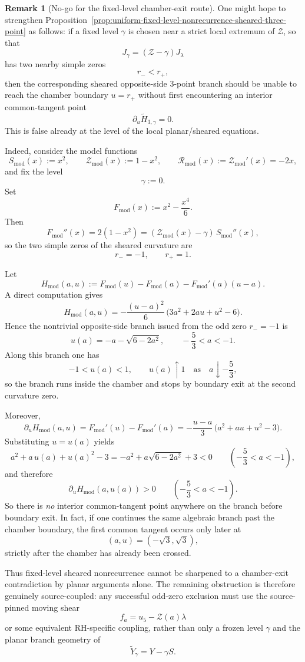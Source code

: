 \documentclass[11pt,a4paper]{amsart}
\theoremstyle{plain}
\theoremstyle{definition}
\newtheorem{remark}[theorem]{Remark}
\begin{document}
\begin{remark}[No-go for the fixed-level chamber-exit route]
\label{rem:no-go-fixed-level-chamber-exit-route}
One might hope to strengthen
Proposition~\ref{prop:uniform-fixed-level-nonrecurrence-sheared-three-point}
as follows: if a fixed level $\gamma$ is chosen near a strict local extremum of
$\mathcal Z$, so that
\[
J_\gamma=(\mathcal Z-\gamma)J_\lambda
\]
has two nearby simple zeros
\[
r_-<r_+,
\]
then the corresponding sheared opposite-side $3$-point branch should be unable
to reach the chamber boundary $u=r_+$ without first encountering an interior
common-tangent point
\[
\partial_u \widetilde H_{3,\gamma}=0.
\]
This is false already at the level of the local planar/sheared equations.

Indeed, consider the model functions
\[
S_{\mathrm{mod}}(x):=x^2,
\qquad
\mathcal Z_{\mathrm{mod}}(x):=1-x^2,
\qquad
\mathcal R_{\mathrm{mod}}(x):=\mathcal Z_{\mathrm{mod}}'(x)=-2x,
\]
and fix the level
\[
\gamma:=0.
\]
Set
\[
F_{\mathrm{mod}}(x):=x^2-\frac{x^4}{6}.
\]
Then
\[
F_{\mathrm{mod}}''(x)=2(1-x^2)
=
(\mathcal Z_{\mathrm{mod}}(x)-\gamma)\,S_{\mathrm{mod}}''(x),
\]
so the two simple zeros of the sheared curvature are
\[
r_-=-1,
\qquad
r_+=1.
\]

Let
\[
H_{\mathrm{mod}}(a,u):=
F_{\mathrm{mod}}(u)-F_{\mathrm{mod}}(a)-F_{\mathrm{mod}}'(a)(u-a).
\]
A direct computation gives
\[
H_{\mathrm{mod}}(a,u)
=
-\frac{(u-a)^2}{6}\,
\bigl(3a^2+2au+u^2-6\bigr).
\]
Hence the nontrivial opposite-side branch issued from the odd zero $r_-=-1$ is
\[
u(a)=-a-\sqrt{6-2a^2},
\qquad
-\frac53<a<-1.
\]
Along this branch one has
\[
-1<u(a)<1,
\qquad
u(a)\uparrow 1
\quad\text{as}\quad
a\downarrow -\frac53,
\]
so the branch runs inside the chamber and stops by boundary exit at the second
curvature zero.

Moreover,
\[
\partial_u H_{\mathrm{mod}}(a,u)
=
F_{\mathrm{mod}}'(u)-F_{\mathrm{mod}}'(a)
=
-\frac{u-a}{3}\,\bigl(a^2+au+u^2-3\bigr).
\]
Substituting $u=u(a)$ yields
\[
a^2+a\,u(a)+u(a)^2-3
=
-a^2+a\sqrt{6-2a^2}+3<0
\qquad
\left(-\frac53<a<-1\right),
\]
and therefore
\[
\partial_u H_{\mathrm{mod}}(a,u(a))>0
\qquad
\left(-\frac53<a<-1\right).
\]
So there is \emph{no} interior common-tangent point anywhere on the branch
before boundary exit. In fact, if one continues the same algebraic branch past
the chamber boundary, the first common tangent occurs only later at
\[
(a,u)=(-\sqrt3,\sqrt3),
\]
strictly after the chamber has already been crossed.

Thus fixed-level sheared nonrecurrence cannot be sharpened to a chamber-exit
contradiction by planar arguments alone. The remaining obstruction is therefore
genuinely source-coupled: any successful odd-zero exclusion must use the
source-pinned moving shear
\[
f_a=u_5-\mathcal Z(a)\lambda
\]
or some equivalent RH-specific coupling, rather than only a frozen level
$\gamma$ and the planar branch geometry of
\[
\widetilde Y_\gamma=Y-\gamma S.
\]
\end{remark}
\end{document}
